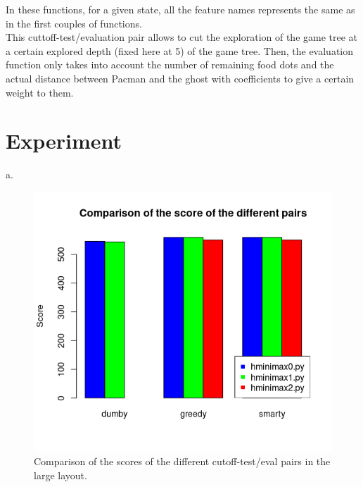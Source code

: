 \documentclass{article}
\begin{document}
\begin{enumerate}[label=\alph*.,leftmargin=*]
\begin{itemize}
\begin{itemize}
					In these functions, for a given state, all the feature names represents the same as in the first couples of functions.\\
				
					This cuttoff-test/evaluation pair allows to cut the exploration of the game tree at a certain explored depth (fixed here at 5) of the game tree. Then, the evaluation function only takes into account the number of remaining food dots and the actual distance between Pacman and the ghost with coefficients to give a certain weight to them.\\
				\end{itemize}
		\end{itemize}
\end{enumerate}

\section{Experiment}
a.
		\begin{figure}[H]
			\centering
			\includegraphics[scale=0.75]{plots/3a_scores.png} 
			\caption{Comparison of the scores of the different cutoff-test/eval pairs in the large layout.}
		\end{figure}
\end{document}
